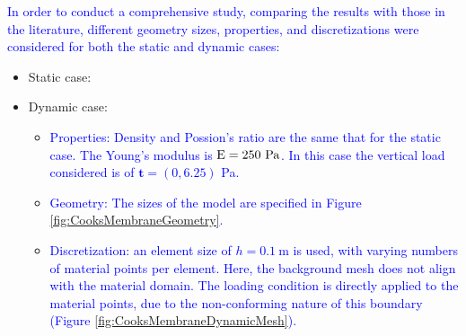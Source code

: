 \documentclass[11pt,english]{article}
\newcommand{\LM}[1]{\textcolor{blue}{#1}}
\begin{document}
    \LM{
    In order to conduct a comprehensive study, comparing the results with those in the literature, different geometry sizes, properties, and discretizations were considered for both the static and dynamic cases:}
    \begin{itemize}
    	\item %
    	Static case:
    	
    	\item 	
    	Dynamic case:
     
    	    	\begin{itemize}
        
    		\item[-] \LM{Properties: Density and Possion's ratio are the same that for the static case. The Young's modulus is $\rm{E}=250\ \rm{Pa}$. In this case the vertical load considered is of $\boldsymbol{t}=(0,6.25)$ Pa. }
    		\item[-] \LM{Geometry:  The sizes of the model are specified in Figure \ref{fig:CooksMembraneGeometry}.}
    		\item[-] \LM{Discretization: an element size of $h=0.1\ \text{m}$ is used,  with varying numbers of material points per element. Here, the background mesh does not align with the material domain. The loading condition is directly applied to the material points, due to the non-conforming nature of this boundary \cite{chandra2021} (Figure \ref{fig:CooksMembraneDynamicMesh}).}
    		\end{itemize}

    \end{itemize}
    
\end{document}
